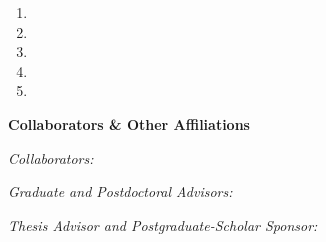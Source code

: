 
\begin{enumerate}
\item

\item

\item

\item

\item
\end{enumerate}

\vspace{12pt}
{\bf Collaborators \& Other Affiliations}

\vspace{12pt}
\emph{Collaborators:}

\vspace{12pt}
\emph{Graduate and Postdoctoral Advisors:}

\vspace{12pt}
\emph{Thesis Advisor and Postgraduate-Scholar Sponsor:}
